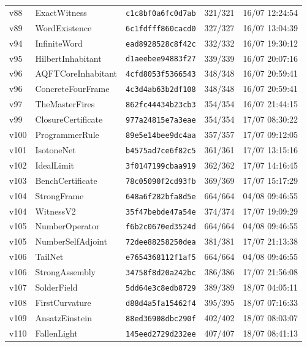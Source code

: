 \documentclass[11pt]{article}
\theoremstyle{definition}\newtheorem{deriv}{Derivação}
\begin{document}
{\begin{longtable}{@{}lllll@{}}
v88 & ExactWitness & \texttt{c1c8bf0a6fc0d7ab} & 321/321 & 16/07 12:24:54 \\
v89 & WordExistence & \texttt{6c1fdfff860cacd0} & 327/327 & 16/07 13:04:39 \\
v94 & InfiniteWord & \texttt{ead8928528c8f42c} & 332/332 & 16/07 19:30:12 \\
v95 & HilbertInhabitant & \texttt{d1aeebee94883f27} & 339/339 & 16/07 20:07:16 \\
v96 & AQFTCoreInhabitant & \texttt{4cfd8053f5366543} & 348/348 & 16/07 20:59:41 \\
v96 & ConcreteFourFrame & \texttt{4c3d4ab63b2df108} & 348/348 & 16/07 20:59:41 \\
v97 & TheMasterFires & \texttt{862fc44434b23cb3} & 354/354 & 16/07 21:44:15 \\
v99 & ClosureCertificate & \texttt{977a24815e7a3eae} & 354/354 & 17/07 08:30:22 \\
v100 & ProgrammerRule & \texttt{89e5e14bee9dc4aa} & 357/357 & 17/07 09:12:05 \\
v101 & IsotoneNet & \texttt{b4575ad7ce6f82c5} & 361/361 & 17/07 13:15:16 \\
v102 & IdealLimit & \texttt{3f0147199cbaa919} & 362/362 & 17/07 14:16:45 \\
v103 & BenchCertificate & \texttt{78c05090f2cd93fb} & 369/369 & 17/07 15:17:29 \\
v104 & StrongFrame & \texttt{648a6f282bfa8d5e} & 664/664 & 04/08 09:46:55 \\
v104 & WitnessV2 & \texttt{35f47bebde47a54e} & 374/374 & 17/07 19:09:29 \\
v105 & NumberOperator & \texttt{f6b2c0670ed3524d} & 664/664 & 04/08 09:46:55 \\
v105 & NumberSelfAdjoint & \texttt{72dee88258250dea} & 381/381 & 17/07 21:13:38 \\
v106 & TailNet & \texttt{e7654368112f1af5} & 664/664 & 04/08 09:46:55 \\
v106 & StrongAssembly & \texttt{34758f8d20a242bc} & 386/386 & 17/07 21:56:08 \\
v107 & SolderField & \texttt{5dd64e3c8edb8729} & 389/389 & 18/07 04:05:11 \\
v108 & FirstCurvature & \texttt{d88d4a5fa15462f4} & 395/395 & 18/07 07:16:33 \\
v109 & AnsatzEinstein & \texttt{88ed36908dbc290f} & 402/402 & 18/07 08:03:07 \\
v110 & FallenLight & \texttt{145eed2729d232ee} & 407/407 & 18/07 08:41:13 \\

\end{longtable}}
\end{document}
